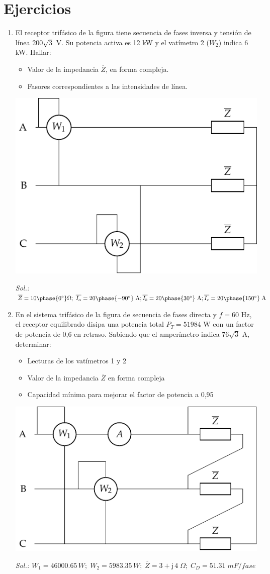 \section*{Ejercicios}
\begin{enumerate}

\item El receptor trifásico de la figura tiene secuencia de fases
  inversa y tensión de línea 200$\sqrt{3}$ V. Su potencia activa es 12
  kW y el vatímetro 2 ($W_2$) indica 6 kW. Hallar:
  \begin{itemize}
  \item Valor de la impedancia $\overline{Z}$, en forma compleja.
  \item Fasores correspondientes a las intensidades de línea.
  \end{itemize}

\begin{center}
  \includegraphics[width=0.45\linewidth]{../figs/ej6_BT3.pdf}
\end{center}

\emph{Sol.:
  $\overline{Z}=10\phase{0^\circ}\Omega;\;
  \overline{I_a}={20\phase{-90^\circ}\;\text{A}};
  \overline{I_b}={20\phase{30^\circ}\;\text{A}};
  \overline{I_c}={20\phase{150^\circ}\;\text{A}}$}


\item En el sistema trifásico de la figura de secuencia de fases
  directa y $f=60$ Hz, el receptor equilibrado disipa una potencia
  total $P_T =51984$ W con un factor de potencia de 0,6 en
  retraso. Sabiendo que el amperímetro indica 76$\sqrt{3}$ A,
  determinar:
  \begin{itemize}
  \item Lecturas de los vatímetros 1 y 2
  \item Valor de la impedancia $\overline{Z}$ en forma compleja
  \item Capacidad mínima para mejorar el factor de potencia a 0,95
  \end{itemize}
  \begin{center}
    \includegraphics[width=0.5\linewidth]{../figs/ej4_BT3.pdf}
  \end{center}
  \emph{Sol.:
    $ W_1=46000.65\,W;\; W_2=5983.35\,W;\;
    \overline{Z}=3+\mathrm{j}\,4\;\Omega;\; C_D=51.31\;mF/fase$}


\end{enumerate}
